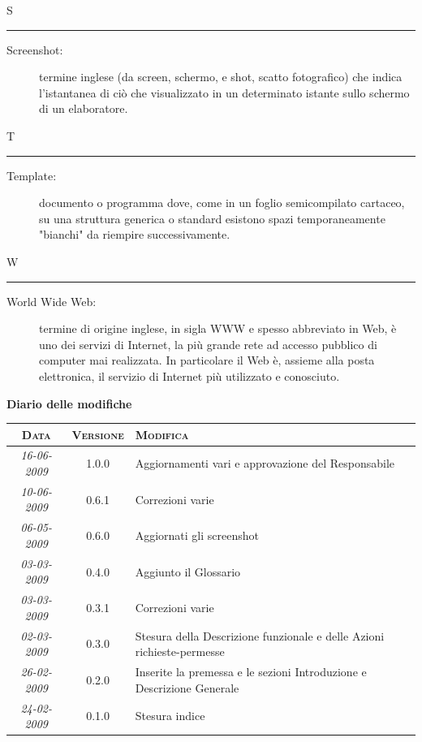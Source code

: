\documentclass[11pt,a4paper]{article}
\newcommand{\modifiche} 
{
\newpage
\begin{center}
\textbf{Diario delle modifiche} \\
\bigskip
\begin{tabular}{|c|c|p{0.62\textwidth}|}
\hline
\textsc{Data} & \textsc{Versione} & \textsc{Modifica} \\
\hline
\hline
\textit{16-06-2009} & 1.0.0 & Aggiornamenti vari e approvazione del Responsabile\\
\hline
\textit{10-06-2009} & 0.6.1 & Correzioni varie\\
\hline
\textit{06-05-2009} & 0.6.0 & Aggiornati gli screenshot\\
\hline
\textit{03-03-2009} & 0.4.0 & Aggiunto il Glossario\\
\hline
\textit{03-03-2009} & 0.3.1 & Correzioni varie\\
\hline
\textit{02-03-2009} & 0.3.0 & Stesura  della Descrizione funzionale e delle Azioni richieste-permesse\\
\hline
\textit{26-02-2009} & 0.2.0 & Inserite la premessa e le sezioni Introduzione e Descrizione Generale\\
\hline
\textit{24-02-2009} & 0.1.0 & Stesura indice\\
\hline
\end{tabular}
\end{center}
}
\begin{document}
\bigskip
\Huge S \bigskip
\hrule
\smallskip
\normalsize
\begin{description}
	\item[Screenshot:] termine inglese (da screen, schermo, e shot, scatto fotografico) che indica l'istantanea di ciò che visualizzato in un determinato istante sullo schermo di un elaboratore.
\end{description}
\bigskip
\Huge T \bigskip
\hrule
\smallskip
\normalsize
\begin{description}
	\item[Template:] documento o programma dove, come in un foglio semicompilato cartaceo, su una struttura generica o standard esistono spazi temporaneamente "bianchi" da riempire successivamente.
\end{description}
\bigskip
\Huge W \bigskip
\hrule
\smallskip
\normalsize
\begin{description}
	\item[World Wide Web:] termine di origine inglese, in sigla WWW e spesso abbreviato in Web, è uno dei servizi di Internet, la più grande rete ad accesso pubblico di computer mai realizzata. In particolare il Web è, assieme alla posta elettronica, il servizio di Internet più utilizzato e conosciuto.
\end{description}
\modifiche
\end{document}
